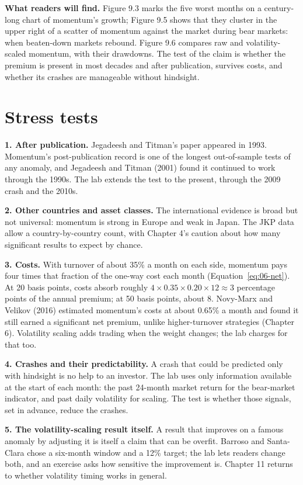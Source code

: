 \textbf{What readers will find.} Figure 9.3 marks the five worst months on a century-long chart of momentum's growth; Figure 9.5 shows that they cluster in the upper right of a scatter of momentum against the market during bear markets: when beaten-down markets rebound. Figure 9.6 compares raw and volatility-scaled momentum, with their drawdowns. The test of the claim is whether the premium is present in most decades and after publication, survives costs, and whether its crashes are manageable without hindsight.

\section{Stress tests}
\label{sec:09-stress}

\textbf{1. After publication.} Jegadeesh and Titman's paper appeared in 1993. Momentum's post-publication record is one of the longest out-of-sample tests of any anomaly, and Jegadeesh and Titman (2001) found it continued to work through the 1990s. The lab extends the test to the present, through the 2009 crash and the 2010s.

\textbf{2. Other countries and asset classes.} The international evidence is broad but not universal: momentum is strong in Europe and weak in Japan. The JKP data allow a country-by-country count, with Chapter 4's caution about how many significant results to expect by chance.

\textbf{3. Costs.} With turnover of about 35\% a month on each side, momentum pays four times that fraction of the one-way cost each month (Equation~\eqref{eq:06-net}). At 20 basis points, costs absorb roughly $4 \times 0.35 \times 0.20 \times 12 \approx 3$ percentage points of the annual premium; at 50 basis points, about 8. Novy-Marx and Velikov (2016) estimated momentum's costs at about 0.65\% a month and found it still earned a significant net premium, unlike higher-turnover strategies (Chapter 6). Volatility scaling adds trading when the weight changes; the lab charges for that too.

\textbf{4. Crashes and their predictability.} A crash that could be predicted only with hindsight is no help to an investor. The lab uses only information available at the start of each month: the past 24-month market return for the bear-market indicator, and past daily volatility for scaling. The test is whether those signals, set in advance, reduce the crashes.

\textbf{5. The volatility-scaling result itself.} A result that improves on a famous anomaly by adjusting it is itself a claim that can be overfit. Barroso and Santa-Clara chose a six-month window and a 12\% target; the lab lets readers change both, and an exercise asks how sensitive the improvement is. Chapter 11 returns to whether volatility timing works in general.

